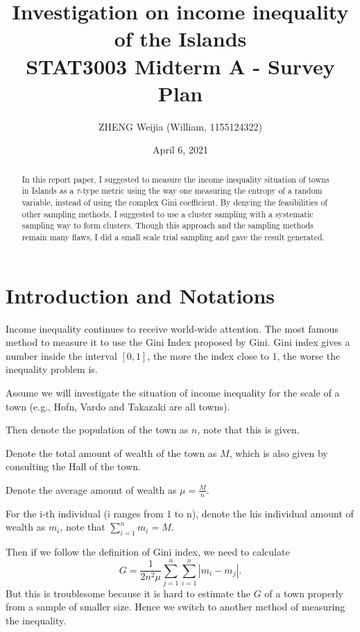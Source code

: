 \documentclass[12pt]{article}%
\begin{document}
\title{Investigation on income inequality of the Islands\\
\Large STAT3003 Midterm A - Survey Plan}
\author{ZHENG Weijia (William, 1155124322)}
\date{April 6, 2021}
\maketitle

\begin{abstract}
    In this report paper, I suggested to measure the income inequality situation of towns in Islands as a $\tau$-type metric using the way one measuring the entropy of a random variable, instead of using the complex Gini coefficient.
    By denying the feasibilities of other sampling methods, I suggested to use a cluster sampling with a systematic sampling way to form clusters. Though this approach and the sampling methods remain many flaws, I did a small scale trial sampling and gave the result generated.

\end{abstract}

\section{Introduction and Notations}
Income inequality continues to receive world-wide attention. The most famous method to measure it to use the Gini Index proposed by Gini. 
Gini index gives a number inside the interval $[0,1]$, the more the index close to 1, the worse the inequality problem is.

Assume we will investigate the situation of income inequality for the scale of a town (e.g., Hofn, Vardo and Takazaki are all towns).

Then denote the population of the town as $n$, note that this is given.

Denote the total amount of wealth of the town as $M$, which is also given by consulting the Hall of the town.

Denote the average amount of wealth as $\mu = \frac{M}{n}$.

For the i-th individual (i ranges from 1 to n), denote the his individual amount of wealth as $m_i$, note that $\sum_{i=1}^{n}m_i=M.$

Then if we follow the definition of Gini index, we need to calculate $$G=\frac{1}{2n^2\mu}\sum_{j=1}^{n}\sum_{i=1}^{n}|m_i-m_j|.$$
But this is troublesome because it is hard to estimate the $G$ of a town properly from a sample of smaller size. 
Hence we switch to another method of measuring the inequality.
\end{document}
